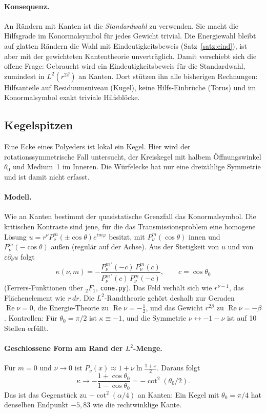 \documentclass[11pt, a4paper]{article}
\theoremstyle{plain}
\theoremstyle{definition}
\begin{document}
\paragraph{Konsequenz.} An Rändern mit Kanten ist die \emph{Standardwahl} zu
verwenden. Sie macht die Hilfsgrade im Konormalsymbol für jedes Gewicht trivial.
Die Energiewahl bleibt auf glatten Rändern die Wahl mit Eindeutigkeitsbeweis
(Satz~\ref{satz:eind}), ist aber mit der gewichteten Kantentheorie unverträglich.
Damit verschiebt sich die offene Frage: Gebraucht wird ein Eindeutigkeitsbeweis für
die Standardwahl, zumindest in $L^2(r^{2\beta})$ an Kanten. Dort stützen ihn alle
bisherigen Rechnungen: Hilfsanteile auf Residuumsniveau (Kugel), keine
Hilfs-Einbrüche (Torus) und im Konormalsymbol exakt triviale Hilfsblöcke.

\subsection{Kegelspitzen}\label{sec:kegel}

Eine Ecke eines Polyeders ist lokal ein Kegel. Hier wird der rotationssymmetrische
Fall untersucht, der Kreiskegel mit halbem Öffnungswinkel $\theta_0$ und Medium~1 im
Inneren. Die Würfelecke hat nur eine dreizählige Symmetrie und ist damit nicht
erfasst.

\paragraph{Modell.} Wie an Kanten bestimmt der quasistatische Grenzfall das
Konormalsymbol. Die kritischen Kontraste sind jene, für die das Transmissionsproblem
eine homogene Lösung $u=r^\nu P_\nu^m(\pm\cos\theta)e^{im\varphi}$ besitzt, mit
$P_\nu^m(\cos\theta)$ innen und $P_\nu^m(-\cos\theta)$ außen (regulär auf der Achse). Aus
der Stetigkeit von $u$ und von $\varepsilon\partial_\theta u$ folgt
\[
  \kappa(\nu,m) = -\frac{P_\nu^{m\,\prime}(-c)\,P_\nu^m(c)}{P_\nu^{m\,\prime}(c)\,P_\nu^m(-c)},\qquad c=\cos\theta_0
\]
(Ferrers-Funktionen über ${}_2F_1$, \texttt{cone.py}). Das Feld verhält sich wie
$r^{\nu-1}$, das Flächenelement wie $r\,dr$. Die $L^2$-Randtheorie gehört deshalb zur
Geraden $\operatorname{Re}\nu=0$, die Energie-Theorie zu $\operatorname{Re}\nu=-\tfrac12$,
und das Gewicht $r^{2\beta}$ zu $\operatorname{Re}\nu=-\beta$. Kontrollen: Für
$\theta_0=\pi/2$ ist $\kappa\equiv-1$, und die Symmetrie $\nu\leftrightarrow-1-\nu$ ist auf
10 Stellen erfüllt.

\paragraph{Geschlossene Form am Rand der $L^2$-Menge.} Für $m=0$ und $\nu\to0$ ist
$P_\nu(x)\approx1+\nu\ln\frac{1+x}{2}$. Daraus folgt
\[
  \kappa\to-\frac{1+\cos\theta_0}{1-\cos\theta_0} = -\cot^2(\theta_0/2).
\]
Das ist das Gegenstück zu $-\cot^2(\alpha/4)$ an Kanten: Ein Kegel mit
$\theta_0=\pi/4$ hat denselben Endpunkt $-5{,}83$ wie die rechtwinklige Kante.
\end{document}
